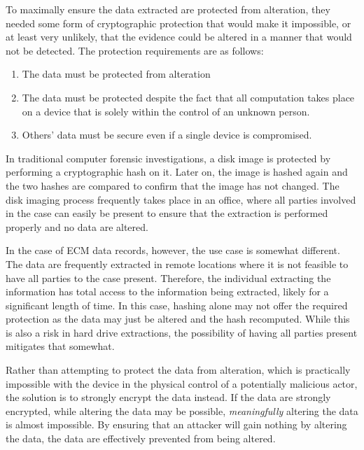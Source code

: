 
To maximally ensure the data extracted are protected from alteration,
they needed some form of cryptographic protection that would make it impossible, or at
least very unlikely, that the evidence could be altered in a manner that would not be
detected. The protection requirements are as follows:

\begin{enumerate}
  \item The data must be protected from alteration
  \item The data must be protected despite the fact that all computation takes
        place on a device that is solely within the control of an unknown person.
  \item Others' data must be secure even if a single device is compromised.

\end{enumerate}


In traditional computer forensic investigations, a disk image is protected by performing
a cryptographic hash on it. Later on, the image is hashed again and the two hashes are compared
to confirm that the image has not changed. The disk imaging process frequently takes place in an
office, where all parties involved in the case can easily be present to ensure that the extraction
is performed properly and no data are altered.

In the case of ECM data records, however, the use case is somewhat different. The data are frequently
extracted in remote locations where it is not feasible to have all parties to the case present. Therefore,
the individual extracting the information has total access to the information being extracted, likely for
a significant length of time. In this case, hashing alone may not offer the required protection as the data
may just be altered and the hash recomputed. While this is also a risk in hard drive extractions, the possibility
of having all parties present mitigates that somewhat.

Rather than attempting to protect the data from alteration, which is practically impossible with the device
in the physical control of a potentially malicious actor, the solution is to strongly encrypt
the data instead. If the data are strongly encrypted, while altering the data may be possible, 
\emph{meaningfully} altering the data is almost impossible. By ensuring that an attacker will gain nothing by
altering the data, the data are effectively prevented from being altered.

